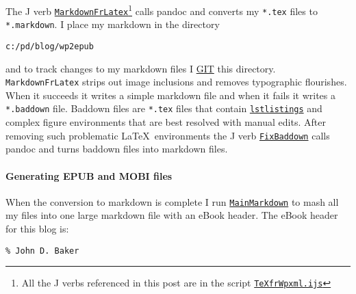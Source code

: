 The J verb \href{https://github.com/bakerjd99/Analyze-the-Data-not-the-Drivel/blob/master/wordpress/TeXfrWpxml.ijs}{\texttt{MarkdownFrLatex}}\footnote{
All the J verbs referenced in this post are in
the script \href{https://github.com/bakerjd99/Analyze-the-Data-not-the-Drivel/blob/master/wordpress/TeXfrWpxml.ijs}{\texttt{TeXfrWpxml.ijs}}
} calls pandoc
and converts my \texttt{*.tex} files to \texttt{*.markdown}. I place my
markdown in the directory
\begin{tcolorbox}[breakable, size=fbox, boxrule=1pt, pad at break*=1mm,colback=cellbackground, colframe=cellborder]
\begin{verbatim}
c:/pd/blog/wp2epub
\end{verbatim}
\end{tcolorbox}
and to track changes to my markdown files I
\href{http://git-scm.com/}{GIT} this directory. \texttt{MarkdownFrLatex}
strips out image inclusions and removes typographic flourishes. When it
succeeds it writes a simple markdown file and when it fails it writes a
\texttt{*.baddown} file. Baddown files are \texttt{*.tex} files that
contain
\href{http://en.wikibooks.org/wiki/LaTeX/Packages/Listings}{\texttt{lstlistings}} and
complex figure environments that are best resolved with manual edits.
After removing such problematic \LaTeX\ environments the J verb
\href{https://github.com/bakerjd99/Analyze-the-Data-not-the-Drivel/blob/master/wordpress/TeXfrWpxml.ijs}{\texttt{FixBaddown}} calls pandoc and turns baddown files into markdown
files.

\paragraph{Generating EPUB and MOBI files}

When the conversion to markdown is complete I run \href{https://github.com/bakerjd99/Analyze-the-Data-not-the-Drivel/blob/master/wordpress/TeXfrWpxml.ijs}{\texttt{MainMarkdown}}
to mash all my files into one large markdown file with an eBook header.
The eBook header for this blog is:


\begin{tcolorbox}[breakable, size=fbox, boxrule=1pt, pad at break*=1mm,colback=cellbackground, colframe=cellborder]
\begin{lstlisting}[language=jdoc,frame=single,framerule=0pt,label=lst:scr2587X0]
% Analyze the Data not the Drivel
% John D. Baker
\end{lstlisting}
\end{tcolorbox}

